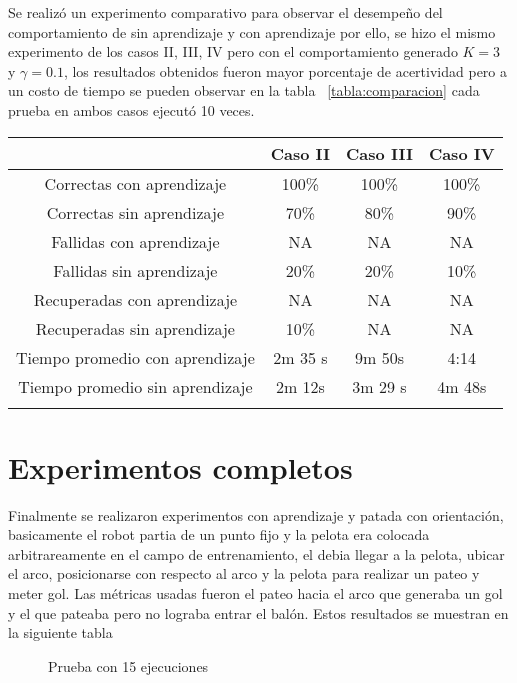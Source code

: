 Se realiz\'o un experimento comparativo para observar el desempe\~no del comportamiento de sin aprendizaje y con aprendizaje por ello, se hizo el mismo experimento de los casos II, III, IV pero con el comportamiento generado $K = 3 $ y $ \gamma = 0.1$,  los resultados obtenidos fueron mayor porcentaje de acertividad pero a un costo de tiempo se pueden observar en la tabla ~\ref{tabla:comparacion}  cada prueba en ambos casos ejecut\'o 10 veces.
\begin{tabular}{|c|c|c|c|}
\hline  & Caso II & Caso III & Caso IV \\ 
\hline 
Correctas con aprendizaje & 100\% & 100\% & 100\% \\ 
\hline 
Correctas sin aprendizaje & 70\% & 80\% & 90\% \\ 
\hline 
Fallidas con aprendizaje & NA & NA & NA \\ 
\hline 
Fallidas sin aprendizaje & 20\% & 20\% & 10\% \\ 
\hline 
Recuperadas con aprendizaje & NA & NA & NA \\ 
\hline 
Recuperadas sin aprendizaje & 10\% & NA & NA \\ 
\hline 
Tiempo promedio con aprendizaje & 2m 35 s & 9m 50s & 4:14 \\ 
\hline 
Tiempo promedio sin aprendizaje & 2m 12s & 3m 29 s & 4m 48s \\
\hline
\label{tabla:comparacion}
\end{tabular} 


\section{Experimentos completos}

Finalmente se realizaron experimentos con aprendizaje y patada con orientaci\'on, basicamente el robot partia de un punto fijo y la pelota era colocada arbitrareamente en el campo de entrenamiento, el debia llegar a la pelota, ubicar el arco, posicionarse con respecto al arco y la pelota para realizar un pateo y meter gol.
Las m\'etricas usadas fueron el pateo hacia el arco que generaba un gol y el que pateaba pero no lograba entrar el bal\'on. Estos resultados se muestran en la siguiente tabla


\begin{figure}[h]
\caption{Prueba con 15 ejecuciones}
\label{fig:k5y7}
\end{figure} 

